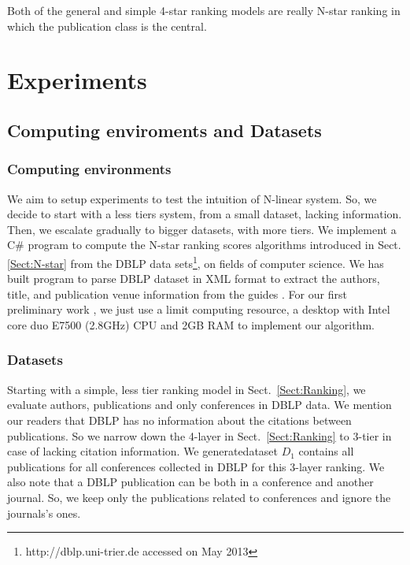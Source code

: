 \documentclass[10pt,leqno,twoside]{article}
\begin{document}
Both of the general and simple  4-star ranking models are really N-star ranking in which the publication class is the central.



\section{Experiments}\label{Sect:Experiments}
\subsection{Computing enviroments and Datasets}\label{Sect:Dataset}
\subsubsection{Computing environments}

We aim to setup experiments to test the intuition of N-linear system. So, we decide to start with a less tiers system, from a small dataset, lacking information. Then, we escalate gradually to bigger datasets, with more tiers. 
We implement a C\# program to compute the N-star ranking scores algorithms introduced in Sect. \ref{Sect:N-star} from the DBLP data sets\footnote{http://dblp.uni-trier.de accessed on May 2013}, on fields of computer science.
We has built program to parse DBLP dataset in XML format to extract the authors, title, and publication venue information from the guides \cite{MichaelLey09,MichaelLey06}.  
For our first preliminary work \cite{Vu14}, we just use a limit computing resource, a desktop with Intel core duo E7500 (2.8GHz) CPU and 2GB RAM to implement our algorithm.

\subsubsection{Datasets} 

Starting with a simple, less tier ranking model in Sect.~\ref{Sect:Ranking}, we evaluate authors, publications and only conferences in DBLP data. We mention our readers that DBLP has no information about the citations between publications. So we narrow down the 4-layer in Sect.~\ref{Sect:Ranking} to 3-tier in case of lacking citation information. We generatedataset $D_1$ contains all publications for all conferences collected in DBLP for this 3-layer ranking. We also note that a DBLP publication can be both in a conference and another journal. So, we keep only the publications related to conferences and ignore the journals's ones.
\end{document}
